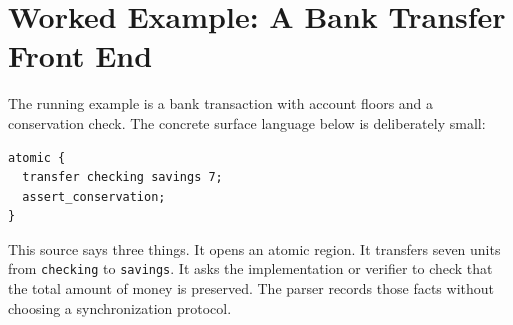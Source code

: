 \section{Worked Example: A Bank Transfer Front End}

The running example is a bank transaction with account floors and a conservation
check. The concrete surface language below is deliberately small:

\begin{lstlisting}[language={}, caption={The tiny source language parsed by Listing~\ref{lst:bank-parser}.}]
atomic {
  transfer checking savings 7;
  assert_conservation;
}
\end{lstlisting}

This source says three things. It opens an atomic region. It transfers seven units from \texttt{checking} to \texttt{savings}. It asks the implementation or verifier to check that the total amount of money is preserved. The parser records those facts without choosing a synchronization protocol.

